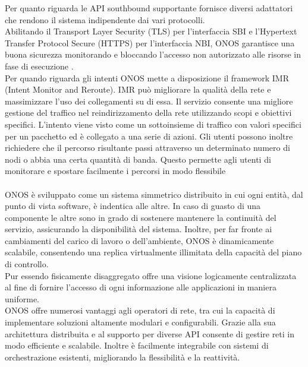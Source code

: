 Per quanto riguarda le API southbound supportante fornisce diversi adattatori che rendono il sistema indipendente dai vari protocolli.
\\Abilitando il Transport Layer Security (TLS) per l'interfaccia SBI e l'Hypertext Transfer Protocol Secure (HTTPS) per l'interfaccia NBI, 
ONOS garantisce una buona sicurezza monitorando e bloccando l’accesso non autorizzato alle risorse in fase di esecuzione \cite{artONOS}.
\\Per quando riguarda gli intenti ONOS mette a disposizione il framework IMR (Intent Monitor and Reroute).
IMR può migliorare la qualità della rete e massimizzare l'uso dei collegamenti su di essa.
Il servizio consente una migliore gestione del traffico nel reindirizzamento della rete utilizzando scopi e obiettivi specifici.
L'intento viene visto come un sottoinsieme di traffico con valori specifici per un pacchetto ed è collegato a una serie di azioni.
Gli utenti possono inoltre richiedere che il percorso risultante passi attraverso un determinato numero di nodi o abbia una certa quantità di banda.
Questo permette agli utenti di monitorare e spostare facilmente i percorsi in modo flessibile \cite{ONOSart}
\\
\\ONOS è sviluppato come un sistema simmetrico distribuito in cui ogni entità, dal punto di vista software, è indentica alle altre. 
In caso di guasto di una componente le altre sono in grado di sostenere mantenere la continuità del servizio, assicurando la disponibilità del sistema. Inoltre, per far fronte ai cambiamenti del carico di lavoro o dell'ambiente, ONOS è dinamicamente scalabile, 
consentendo una replica virtualmente illimitata della capacità del piano di controllo.
\\Pur essendo fisicamente disaggregato offre una visione logicamente centralizzata al fine di fornire l'accesso di ogni informazione alle applicazioni in maniera uniforme.
\\ONOS offre numerosi vantaggi agli operatori di rete, tra cui la capacità di implementare soluzioni altamente modulari e configurabili. 
Grazie alla sua architettura distribuita e al supporto per diverse API consente di gestire reti in modo efficiente e scalabile.
Inoltre è facilmente integrabile con sistemi di orchestrazione esistenti, migliorando la flessibilità e la 
reattività.



